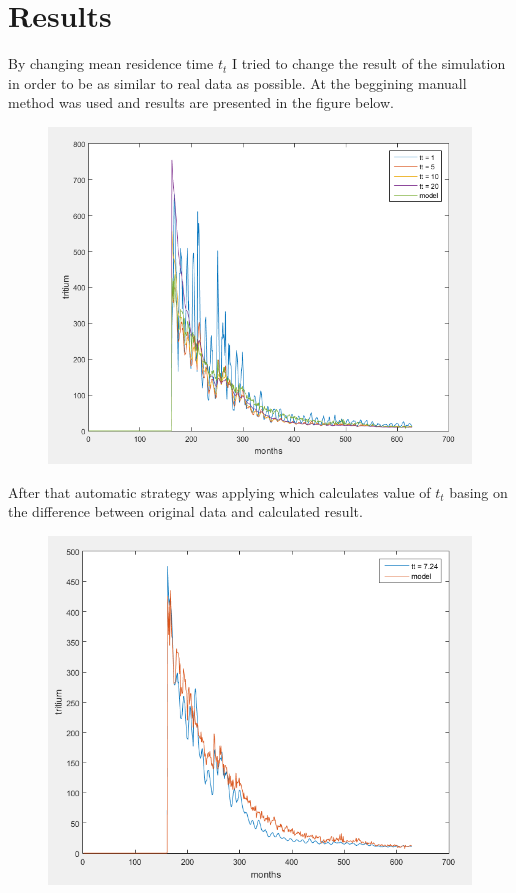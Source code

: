 \documentclass[a4paper,12pt]{article}
\begin{document}
\section{Results}
By changing mean residence time $t_t$ I tried to change the result of the simulation in order to be as similar to real data as possible. At the beggining manuall method was used and results are presented in the figure below.
\begin{figure}[H]
\centerline{\includegraphics[scale=0.8]{manuall}}
\end{figure}
After that automatic strategy was applying which calculates value of $t_t$ basing on the difference between original data and calculated result. 
\begin{figure}[H]
\centerline{\includegraphics[scale=0.8]{calculated}}
\end{figure}
\end{document}
